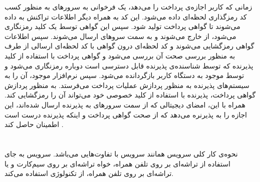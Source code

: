 \documentclass[oneside]{report}
\begin{document}
  زمانی که کاربر اجازه‌ی پرداخت را می‌دهد، یک فرخوانی به سرورهای 
  {\normalsize {}} 
  به منظور کسب کد رمزگذاری لحظه‌ای 
     داده می‌شود. این کد به همراه دیگر اطلاعات تراکنش به 
      {\normalsize {}} 
      داده می‌شوند تا گواهی پرداخت 
      تولید شود. سپس این گواهی توسط یک کلید 
       {\normalsize {}} 
    رمزنگاری می‌شود،  از 
     {\normalsize {}} 
     خارج می‌شوند 
    و به سمت سروهای 
     {\normalsize {}} 
     ارسال می‌شوند. سپس اطلاعات گواهی رمزگشایی می‌شوند و کد لحظه‌ای درون گواهی با کد لحظه‌ای ارسالی از طرف 
          {\normalsize {}} 
    به منظور بررسی صحت آن بررسی می‌شود و گواهی پرداخت با استفاده از کلید پذیرنده که توسط شناسنده‌ی پذیرنده قابل دسترسی است دوباره رمزنگاری می‌شود و  توسط 
         {\normalsize {}} 
         موجود به دستگاه کاربر بازگردانده می‌شود.  سپس نرم‌افزار موجود، آن را به سیستم‌های پذیرنده به منظور پردازش عملیات پرداخت می‌فرستد. به منظور پردازش گواهی پرداخت،  پذیرنده با استفاده از کلید خصوصی 
         خود می‌تواند آن را رمزگشایی کند. همراه با این،  امضای دیجیتالی که از سمت سرورهای 
         {\normalsize {}} 
                به پذیرنده ارسال شده‌اند، این اجازه را به پذیرنره می‌دهد که از صحت گواهی پرداخت و اینکه پذیرنده درست است اطمینان حاصل کند
      \cite{iossecurity}.
      
      \section{{\large{}}}
 نحوه‌ی کار کلی سرویس 
       	{\normalsize {}}
       	همانند سرویس
       	      	{\normalsize {}}
       	با تفاوت‌هایی می‌باشد. سرویس 
       	      	{\normalsize {}} 
       	      	به جای استفاده از تراشه‌ای بر روی تلفن همراه، خواه تراشه‌ای بر روی سیم‌کارت و یا تراشه‌ای بر روی  تلفن‌ همراه، از تکنولوژی
       	      	      	{\normalsize {}} 
       	      	      	استفاده می‌کند. 
      
\end{document}

